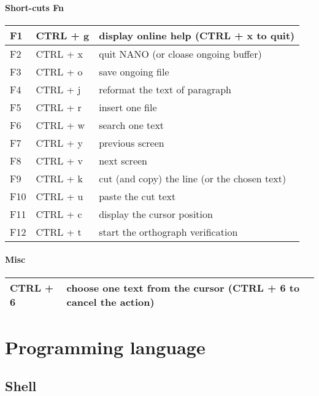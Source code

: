 \documentclass[letterpaper,10pt,english]{sphinxmanual}
\begin{document}
\subsubsection{Short-cuts Fn}
\label{editor/nano:short-cuts-fn}
\begin{tabulary}{\linewidth}{|L|L|L|}
\hline

F1
 & 
CTRL + g
 & 
display online help (CTRL + x to quit)
\\
\hline
F2
 & 
CTRL + x
 & 
quit NANO (or cloase ongoing buffer)
\\
\hline
F3
 & 
CTRL + o
 & 
save ongoing file
\\
\hline
F4
 & 
CTRL + j
 & 
reformat the text of paragraph
\\
\hline
F5
 & 
CTRL + r
 & 
insert one file
\\
\hline
F6
 & 
CTRL + w
 & 
search one text
\\
\hline
F7
 & 
CTRL + y
 & 
previous screen
\\
\hline
F8
 & 
CTRL + v
 & 
next screen
\\
\hline
F9
 & 
CTRL + k
 & 
cut (and copy) the line (or the chosen text)
\\
\hline
F10
 & 
CTRL + u
 & 
paste the cut text
\\
\hline
F11
 & 
CTRL + c
 & 
display the cursor position
\\
\hline
F12
 & 
CTRL + t
 & 
start the orthograph verification
\\
\hline\end{tabulary}



\subsubsection{Misc}
\label{editor/nano:misc}
\begin{tabulary}{\linewidth}{|L|L|}
\hline

CTRL + 6
 & 
choose one text from the cursor (CTRL + 6 to cancel the action)
\\
\hline\end{tabulary}



\chapter{Programming language}
\label{index:programming-language}

\section{Shell}
\label{language/shell:shell}\label{language/shell::doc}
\end{document}
